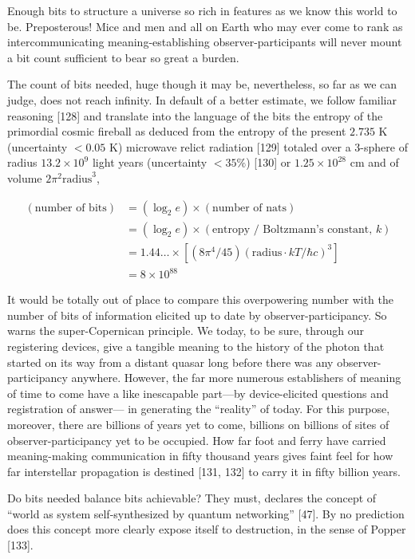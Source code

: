 \documentclass[11pt]{article}
\begin{document}
	Enough bits to structure a universe so rich in features as we know this world to
	be. Preposterous! Mice and men and all on Earth who may ever come to rank as
	intercommunicating meaning-establishing observer-participants will never mount a
	bit count sufficient to bear so great a burden.
	
	The count of bits needed, huge though it may be, nevertheless, so far as we
	can judge, does not reach infinity. In default of a better estimate, we follow familiar reasoning [128] and translate into the language of the bits the entropy of
	the primordial cosmic fireball as deduced from the entropy of the present $2.735$ K
	(uncertainty $<0.05$ K) microwave relict radiation [129] totaled over a 3-sphere of
	radius $13.2 \times 10^9$ light years (uncertainty $<35\%$) [130] or $1.25 \times 10^{28}$ cm and of
	volume $2\pi^2 \text{radius}^3$,
	
	\begin{align*}
		(\text{number of bits}) &= (\log_2 e) \times (\text{number of nats}) \\
		&= (\log_2 e) \times (\text{entropy / Boltzmann's constant, } k) \\
		&= 1.44\ldots \times [(8\pi^4/45)(\text{radius} \cdot kT/\hbar c)^3] \\
		&= 8 \times 10^{88}
		\tag{19.3}
	\end{align*}
	
	It would be totally out of place to compare this overpowering number with the number of bits of information elicited up to date by observer-participancy. So warns
	the super-Copernican principle. We today, to be sure, through our registering devices, give a tangible meaning to the history of the photon that started on its way
	from a distant quasar long before there was any observer-participancy anywhere.
	However, the far more numerous establishers of meaning of time to come have a
	like inescapable part---by device-elicited questions and registration of answer---
	in generating the ``reality'' of today. For this purpose, moreover, there are billions of years yet to come, billions on billions of sites of observer-participancy yet
	to be occupied. How far foot and ferry have carried meaning-making communication in fifty thousand years gives faint feel for how far interstellar propagation is
	destined [131, 132] to carry it in fifty billion years.
	
	Do bits needed balance bits achievable? They must, declares the concept of
	``world as system self-synthesized by quantum networking'' [47]. By no prediction
	does this concept more clearly expose itself to destruction, in the sense of Popper [133].
	
\end{document}
